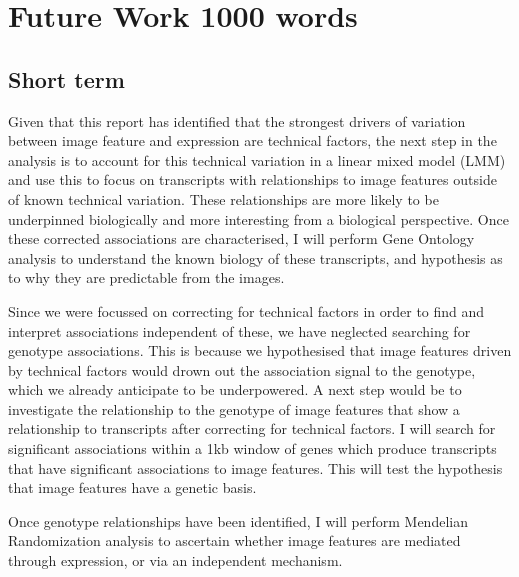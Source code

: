 \documentclass[graybox]{svmult}
\begin{document}
\section{Future Work 1000 words}



\subsection{Short term}

Given that this report has identified that the strongest drivers of variation between image feature and expression are technical factors, the next step in the analysis is to account for this technical variation in a linear mixed model (LMM) and use this to focus on transcripts with relationships to image features outside of known technical variation. These relationships are more likely to be underpinned biologically and more interesting from a biological perspective. Once these corrected associations are characterised, I will perform Gene Ontology analysis to understand the known biology of these transcripts, and hypothesis as to why they are predictable from the images.

Since we were focussed on correcting for technical factors in order to find and interpret associations independent of these, we have neglected searching for genotype associations. This is because we hypothesised that image features driven by technical factors would drown out the association signal to the genotype, which we already anticipate to be underpowered. A next step would be to investigate the relationship to the genotype of image features that show a relationship to transcripts after correcting for technical factors. I will  search for significant associations within a 1kb window of genes which produce transcripts that have significant associations to image features. This will test the hypothesis that image features have a genetic basis.

Once genotype relationships have been identified, I will perform Mendelian Randomization \cite{mendelian-randomization} analysis to ascertain whether image features are mediated through expression, or via an independent mechanism.
\end{document}
